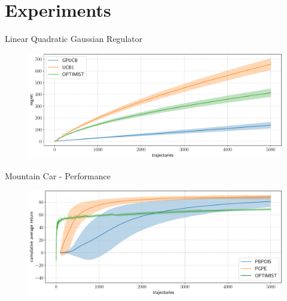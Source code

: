 \section{Experiments}

\begin{frame}{Linear Quadratic Gaussian Regulator}

\begin{figure}
		\centering
		\includegraphics[width=0.7\linewidth]{Images/LQGcomparison}
\end{figure}

\end{frame}

\begin{frame}{Mountain Car - Performance}
\begin{figure}
		\centering
		\includegraphics[width=0.7\linewidth]{Images/MC_mu}
\end{figure}
\end{frame}

